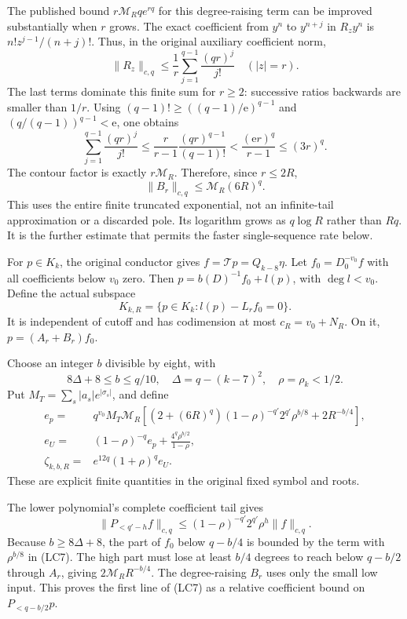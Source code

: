 \documentclass[10pt]{article}
\begin{document}
The published bound \(r\mathcal M_Rqe^{rq}\) for this degree-raising term can be improved substantially when \(r\) grows. The exact coefficient from \(y^n\) to \(y^{n+j}\) in \(R_zy^n\) is \(n!z^{j-1}/(n+j)!\). Thus, in the original auxiliary coefficient norm, \[
 \|R_z\|_{c,q}
 \le\frac1r\sum_{j=1}^{q-1}\frac{(qr)^j}{j!}
 \quad(|z|=r).
\] The last terms dominate this finite sum for \(r\ge2\): successive ratios backwards are smaller than \(1/r\). Using \((q-1)!\ge((q-1)/\mathrm e)^{q-1}\) and \((q/(q-1))^{q-1}<\mathrm e\), one obtains \[
 \sum_{j=1}^{q-1}\frac{(qr)^j}{j!}
 \le\frac{r}{r-1}\frac{(qr)^{q-1}}{(q-1)!}
 <\frac{(\mathrm e r)^q}{r-1}\le(3r)^q.
\] The contour factor is exactly \(r\mathcal M_R\). Therefore, since \(r\le2R\), \[
 \boxed{\|B_r\|_{c,q}\le\mathcal M_R(6R)^q.}
 \tag{LC4a}
\] This uses the entire finite truncated exponential, not an infinite-tail approximation or a discarded pole. Its logarithm grows as \(q\log R\) rather than \(Rq\). It is the further estimate that permits the faster single-sequence rate below.

For \(p\in K_k\), the original conductor gives \(f=\mathcal Tp=Q_{k-8}\eta\). Let \(f_0=D^{-v_0}_0f\) with all coefficients below \(v_0\) zero. Then \(p=b(D)^{-1}f_0+l(p)\), with \(\deg l<v_0\). Define the actual subspace \[
 K_{k,R}=\{p\in K_k:l(p)-L_rf_0=0\}.
\tag{LC5}
\] It is independent of cutoff and has codimension at most \(c_R=v_0+N_R\). On it, \(p=(A_r+B_r)f_0\).

Choose an integer \(b\) divisible by eight, with \[
 8\Delta+8\le b\le q/10,\quad
 \Delta=q-(k-7)^2,\quad \rho=\rho_k<1/2.
\tag{LC6}
\] Put \(M_T=\sum_s|a_s|e^{|\sigma_s|}\), and define \[
 \begin{split}
 e_p={}&q^{v_0}M_T\mathcal M_R
 \left[(2+(6R)^q)(1-\rho)^{-q'}2^{q'}\rho^{b/8}
       +2R^{-b/4}\right],\\
 e_U={}&(1-\rho)^{-q}e_p+
 \frac{4^q\rho^{b/2}}{1-\rho},\\
 \zeta_{k,b,R}={}&e^{12q}(1+\rho)^q e_U.
 \end{split}
 \tag{LC7}
\] These are explicit finite quantities in the original fixed symbol and roots.

The lower polynomial's complete coefficient tail gives \[
 \|P_{<q'-h}f\|_{c,q}
 \le(1-\rho)^{-q'}2^{q'}\rho^h\|f\|_{c,q}.
\] Because \(b\ge8\Delta+8\), the part of \(f_0\) below \(q-b/4\) is bounded by the term with \(\rho^{b/8}\) in (LC7). The high part must lose at least \(b/4\) degrees to reach below \(q-b/2\) through \(A_r\), giving \(2\mathcal M_R R^{-b/4}\). The degree-raising \(B_r\) uses only the small low input. This proves the first line of (LC7) as a relative coefficient bound on \(P_{<q-b/2}p\).
\end{document}
